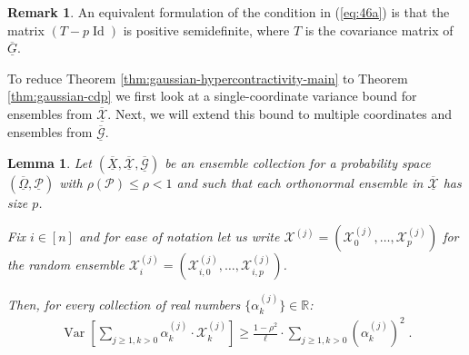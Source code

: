 \documentclass{daj}
\newcommand{\1}{\mathbbm{1}}
\theoremstyle{plain}
\newtheorem{lemma}[theorem]{Lemma}
\theoremstyle{definition}
\newtheorem{remark}[theorem]{Remark}
\DeclareMathOperator*{\Var}{Var}
\DeclareMathOperator{\Id}{Id}
\begin{document}
\begin{remark}
An equivalent formulation of the condition in (\ref{eq:46a}) 
is that the matrix $(T-p \Id)$ is positive semidefinite,
where $T$ is the covariance matrix of $\overline{\underline{G}}$.  
\end{remark}

To reduce Theorem \ref{thm:gaussian-hypercontractivity-main}
to Theorem \ref{thm:gaussian-cdp} we 
first look at a single-coordinate variance bound for 
ensembles from $\overline{\underline{\mathcal{X}}}$. 
Next, we will extend this bound to multiple coordinates
and ensembles from  $\overline{\underline{\mathcal{G}}}$.

\begin{lemma}
\label{lem:gaussian-single-coordinate}
Let $(\overline{\underline{X}}, \overline{\underline{\mathcal{X}}}, 
\overline{\underline{\mathcal{G}}})$
be an ensemble collection
for a probability space 
$(\overline{\underline{\Omega}}, \underline{\mathcal{P}})$
with $\rho(\mathcal{P}) \le \rho < 1$
and such that each orthonormal ensemble in $\overline{\underline{\mathcal{X}}}$
has size $p$.

Fix $i \in [n]$ and for ease of notation
let us write 
$\mathcal{X}^{(j)} = (\mathcal{X}^{(j)}_{0}, \ldots, \mathcal{X}^{(j)}_{p})$
for the random ensemble 
$\mathcal{X}_i^{(j)} = (\mathcal{X}^{(j)}_{i,0}, \ldots, \mathcal{X}^{(j)}_{i,p})$.

Then,
for every collection of real numbers $\{\alpha_{k}^{(j)}\} \in \mathbb{R}$:
\begin{align*}
 \Var\left[ \sum_{j\ge 1, k>0} \alpha_k^{(j)} \cdot \mathcal{X}_k^{(j)} \right]
      \ge \frac{1-\rho^2}{\ell} \cdot \sum_{j \ge 1,k > 0} 
      \left( \alpha_k^{(j)} \right)^2 \; .
\end{align*}
\end{lemma}
\end{document}
